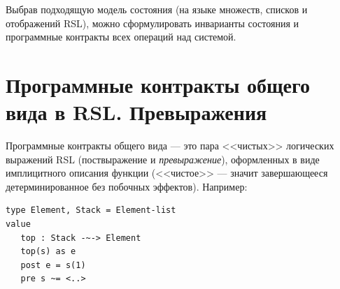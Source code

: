\documentclass[14pt, twoside]{extreport}
\begin{document}
Выбрав подходящую модель состояния (на языке множеств, списков и отображений RSL), можно сформулировать инварианты состояния и программные контракты всех операций над системой.

\section{Программные контракты общего вида в RSL. Превыражения}



Программные контракты общего вида --- это пара <<чистых>> логических выражений RSL (поствыражение и \emph{превыражение}), оформленных в виде имплицитного описания функции (<<чистое>> --- значит завершающееся детерминированное без побочных эффектов). Например:
\begin{lstlisting}
type Element, Stack = Element-list
value
   top : Stack -~-> Element
   top(s) as e
   post e = s(1)
   pre s ~= <..>
\end{lstlisting}
\end{document}
